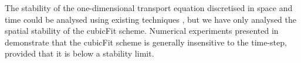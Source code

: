 The stability of the one-dimensional transport equation discretised in space and time could be analysed using existing techniques \citep{baldauf2008}, but we have only analysed the spatial stability of the cubicFit scheme.  Numerical experiments presented in  demonstrate that the cubicFit scheme is generally insensitive to the time-step, provided that it is below a stability limit.
